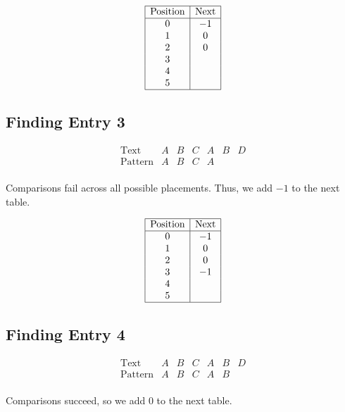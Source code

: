 \documentclass[a4paper,12pt]{article}
\begin{document}
\[
\begin{array}{|c|c|}
\hline
\text{Position} & \text{Next} \\
\hline
0 & -1 \\
1 & 0 \\
2 & 0 \\
3 &  \\
4 &  \\
5 &  \\
\hline
\end{array}
\]

\subsection*{Finding Entry 3}
\[
\begin{array}{c|c|c|c|c|c|c|}
\text{Text} & A & B & C & A & B & D \\
\hline
\text{Pattern} & A & B & C & A &   &   \\
\end{array}
\]

\begin{tcolorbox}[colback=blue!5, colframe=blue!75!black, title=Explanation]
Comparisons fail across all possible placements. Thus, we add \(-1\) to the next table.
\end{tcolorbox}

\[
\begin{array}{|c|c|}
\hline
\text{Position} & \text{Next} \\
\hline
0 & -1 \\
1 & 0 \\
2 & 0 \\
3 & -1 \\
4 &  \\
5 &  \\
\hline
\end{array}
\]

\subsection*{Finding Entry 4}
\[
\begin{array}{c|c|c|c|c|c|c|}
\text{Text} & A & B & C & A & B & D \\
\hline
\text{Pattern} & A & B & C & A & B &   \\
\end{array}
\]

\begin{tcolorbox}[colback=blue!5, colframe=blue!75!black, title=Explanation]
Comparisons succeed, so we add \(0\) to the next table.
\end{tcolorbox}
\end{document}
